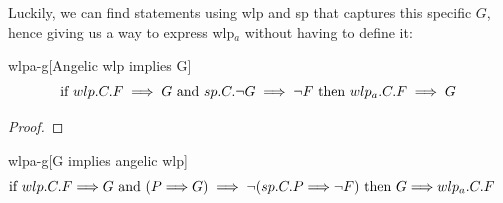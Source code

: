 Luckily, we can find statements using wlp and sp that captures this specific $G$, hence giving us a way to express wlp$_a$ without having to define it: 
\begin{lemma}{wlpa-g}[Angelic wlp implies G]
\ \\ \vspace{-3mm}
	\[\hspace{-2mm}
	\text{ if } \\
	wlp.C.F\implies G
	\\\text{ and } \\ 
	sp.C.\neg G \implies \neg F 
	\\\text{ then } \\ 
	wlp_a.C.F \implies G
	\] 
	\label{lem:wlp-g}
\end{lemma}

\begin{proof}
\end{proof}

\begin{lemma}{wlpa-g}[G implies angelic wlp]
\ \\ \vspace{-3mm}
	\[\hspace{-5mm}
	\text{ if } \\
	wlp.C.F\Longrightarrow G
	\\\text{ and } \\ 
	(P\Longrightarrow G) \implies \neg(sp.C.P \Longrightarrow \neg F)
	\text{ then } 
	G \Longrightarrow wlp_a.C.F
	\] 
\end{lemma}




